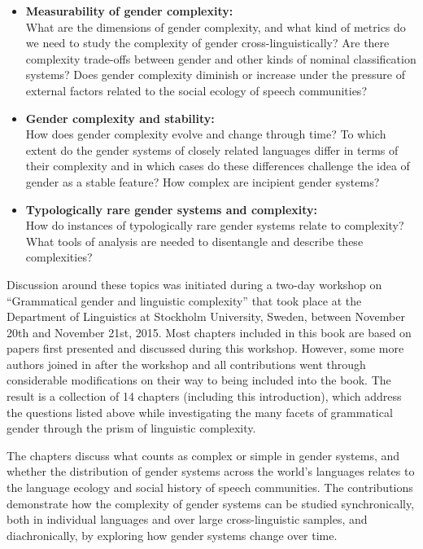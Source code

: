 \documentclass[output=collectionpaper]{langsci/langscibook}
\begin{document}
\begin{itemize}
\item \textbf{Measurability of gender complexity:}\\
What are the dimensions of gender complexity, and what kind of metrics do we need to study the complexity of gender cross-linguistically? Are there complexity trade-offs between gender and other kinds of nominal classification systems? Does gender complexity diminish or increase under the pressure of external factors related to the social ecology of speech communities?
\item \textbf{Gender complexity and stability:}\\
How does gender complexity evolve and change through time? To which extent do the gender systems of closely related languages differ in terms of their complexity and in which cases do these differences challenge the idea of gender as a stable feature? How complex are incipient gender systems?
\item \textbf{Typologically rare gender systems and complexity:}\\
How do instances of typologically rare gender systems relate to complexity? What tools of analysis are needed to disentangle and describe these complexities?
\end{itemize}

\noindent Discussion around these topics was initiated during a two-day workshop on ``Grammatical gender and linguistic complexity'' that took place at the Department of Linguistics at Stockholm University, Sweden, between November 20th and November 21st, 2015. Most chapters included in this book are based on papers first presented and discussed during this workshop. However, some more authors joined in after the workshop and all contributions went through considerable modifications on their way to being included into the book. The result is a collection of 14 chapters (including this introduction), which address the questions listed above while investigating the many facets of grammatical gender through the prism of linguistic complexity.

The chapters discuss what counts as complex or simple in gender systems, and whether the distribution of gender systems across the world’s languages relates to the language ecology and social history of speech communities. The contributions demonstrate how the complexity of gender systems can be studied synchronically, both in individual languages and over large cross-linguistic samples, and diachronically, by exploring how gender systems change over time.
\end{document}

